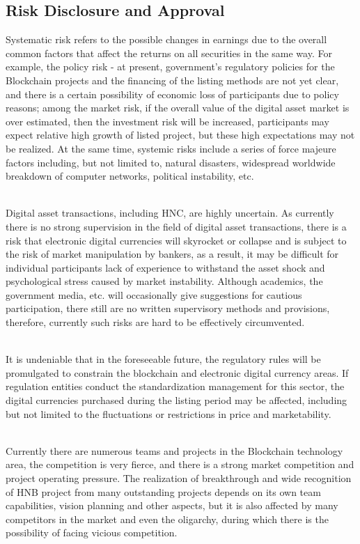 \documentclass[fleqn,10pt]{SelfArx} %
\begin{document}
\subsection{Risk Disclosure and Approval}

Systematic risk refers to the possible changes in earnings due to the overall common factors that affect the returns on all securities in the same way. For example, the policy risk - at present, government's regulatory policies for the Blockchain projects and the financing of the listing methods are not yet clear, and there is a certain possibility of economic loss of participants due to policy reasons; among the market risk, if the overall value of the digital asset market is over estimated, then the investment risk will be increased, participants may expect relative high growth of listed project, but these high expectations may not be realized. At the same time, systemic risks include a series of force majeure factors including, but not limited to, natural disasters, widespread worldwide breakdown of computer networks, political instability, etc.

\\
Digital asset transactions, including HNC, are highly uncertain. As currently there is no strong supervision in the field of digital asset transactions, there is a risk that electronic digital currencies will skyrocket or collapse and is subject to the risk of market manipulation by bankers, as a result, it may be difficult for individual participants lack of experience to withstand the asset shock and psychological stress caused by market instability. Although academics, the government media, etc. will occasionally give suggestions for cautious participation, there still are no written supervisory methods and provisions, therefore, currently such risks are hard to be effectively circumvented.

\\
It is undeniable that in the foreseeable future, the regulatory rules will be promulgated to constrain the blockchain and electronic digital currency areas. If regulation entities conduct the standardization management for this sector, the digital currencies purchased during the listing period may be affected, including but not limited to the fluctuations or restrictions in price and marketability.

\\
Currently there are numerous teams and projects in the Blockchain technology area, the competition is very fierce, and there is a strong market competition and project operating pressure. The realization of breakthrough and wide recognition of HNB project from many outstanding projects depends on its own team capabilities, vision planning and other aspects, but it is also affected by many competitors in the market and even the oligarchy, during which there is the possibility of facing vicious competition.
\end{document}
